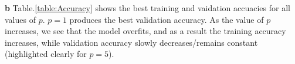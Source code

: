 \documentclass{article}
\begin{document}
\textbf{b} Table.\ref{table:Accuracy} shows the best training and vaidation accuacies for all values of $p$. $p=1$ produces the best validation accuracy. As the value of $p$ increases, we see that the model overfits, and as a result the training accuracy increases, while validation accuracy slowly decreases/remains constant (highlighted clearly for $p=5$). 

\begin{figure}[H]
    \centering
    \\

\end{figure}
\end{document}
